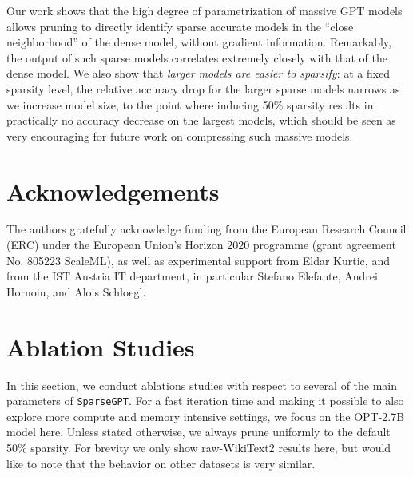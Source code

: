 \documentclass{article}
\theoremstyle{plain}
\theoremstyle{definition}
\theoremstyle{remark}
\newcommand{\sparsegpt}[1]{\texttt{SparseGPT}}
\begin{document}
Our work shows that the high degree of parametrization of massive GPT models allows pruning to directly identify sparse accurate models in the ``close neighborhood'' of the dense model, without gradient information. Remarkably, the output of such sparse models correlates extremely closely with that of the dense model. 
We also show that \emph{larger models are easier to sparsify}: at a fixed sparsity level, the relative accuracy drop for the larger sparse models narrows as we increase model size, to the point where inducing 50\% sparsity results in practically no accuracy decrease on the largest models, which should be seen as very encouraging for future work on compressing such massive models.  

\section{Acknowledgements}

The authors gratefully acknowledge funding from the European Research Council (ERC) under the European Union’s
Horizon 2020 programme (grant agreement No. 805223 ScaleML), as well as experimental support from Eldar Kurtic,
and from the IST Austria IT department, in particular Stefano Elefante, Andrei Hornoiu, and Alois Schloegl.






\newpage
\appendix
\onecolumn

\section{Ablation Studies}
\label{app:ablations}

In this section, we conduct ablations studies with respect to several of the main parameters of \sparsegpt{}. For a fast iteration time and making it possible to also explore more compute and memory intensive settings, we focus on the OPT-2.7B model here. Unless stated otherwise, we always prune uniformly to the default 50\% sparsity. For brevity we only show raw-WikiText2 results here, but would like to note that the behavior on other datasets is very similar.
\end{document}
